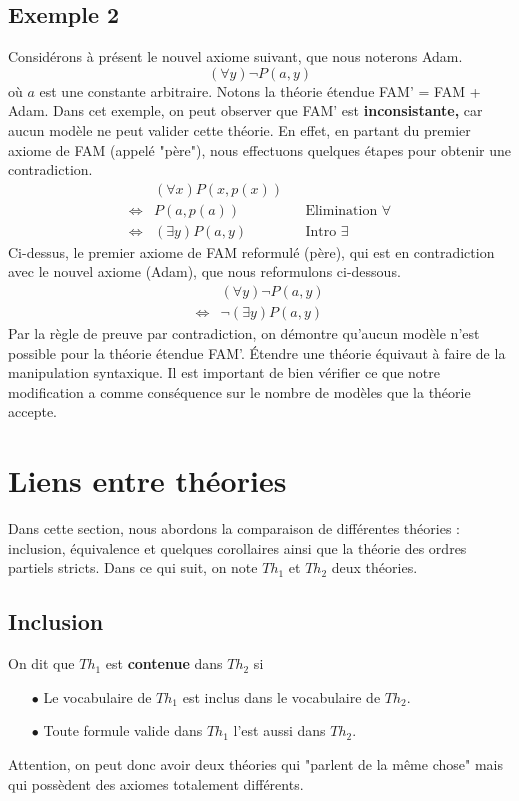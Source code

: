 \subsection*{Exemple 2}
Considérons à présent le nouvel axiome suivant, que nous noterons Adam.
$$ (\forall y) \neg P(a,y) $$
où $a$ est une constante arbitraire. Notons la théorie étendue FAM' = FAM + Adam. Dans cet exemple, on peut observer que FAM' est \textbf{inconsistante,} car aucun modèle ne peut valider cette théorie. En effet, en partant du premier axiome de FAM (appelé "père"), nous effectuons quelques étapes pour obtenir une contradiction.
\begin{align*}
& (\forall x) P(x,p(x)) \\
\Leftrightarrow & P(a,p(a)) && \textrm{Elimination } \forall \\
\Leftrightarrow & (\exists y) P(a,y) && \textrm{Intro } \exists
\end{align*}
Ci-dessus, le premier axiome de FAM reformulé (père), qui est en contradiction avec le nouvel axiome (Adam), que nous reformulons ci-dessous.
\begin{align*}
& (\forall y) \neg P(a,y) \\
\Leftrightarrow & \neg (\exists y) P(a,y)
\end{align*}
Par la règle de preuve par contradiction, on démontre qu'aucun modèle n'est possible pour la théorie étendue FAM'. \'{E}tendre une théorie équivaut à faire de la manipulation syntaxique. Il est important de bien vérifier ce que notre modification a comme conséquence sur le nombre de modèles que la théorie accepte.

\section{Liens entre théories}
Dans cette section, nous abordons la comparaison de différentes théories : inclusion, équivalence et quelques corollaires ainsi que la théorie des ordres partiels stricts. Dans ce qui suit, on note $Th_1$ et $Th_2$ deux théories.

\subsection*{Inclusion}
On dit que $Th_1$ est \textbf{contenue} dans $Th_2$ si
\begin{itemize}
\item[$\bullet$] Le vocabulaire de $Th_1$ est inclus dans le vocabulaire de $Th_2$.
\item[$\bullet$] Toute formule valide dans $Th_1$ l'est aussi dans $Th_2$.
\end{itemize}
Attention, on peut donc avoir deux théories qui "parlent de la même chose" mais qui possèdent des axiomes totalement différents.

